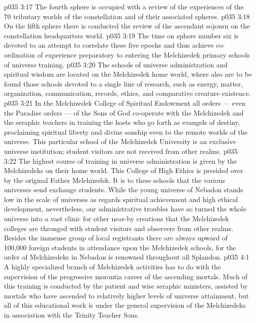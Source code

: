 \vs p035 3:17 \bibnobreakspace The fourth sphere is occupied with a review of the experiences of the 70 tributary worlds of the constellation and of their associated spheres.
\vs p035 3:18 \bibnobreakspace On the fifth sphere there is conducted the review of the ascendant sojourn on the constellation headquarters world.
\vs p035 3:19 \bibnobreakspace The time on sphere number six is devoted to an attempt to correlate these five epochs and thus achieve co\hyp{}ordination of experience preparatory to entering the Melchizedek primary schools of universe training.
\vs p035 3:20 \pc The schools of universe administration and spiritual wisdom are located on the Melchizedek home world, where also are to be found those schools devoted to a single line of research, such as energy, matter, organization, communication, records, ethics, and comparative creature existence.
\vs p035 3:21 In the Melchizedek College of Spiritual Endowment all orders --- even the Paradise orders --- of the Sons of God co\hyp{}operate with the Melchizedek and the seraphic teachers in training the hosts who go forth as evangels of destiny, proclaiming spiritual liberty and divine sonship even to the remote worlds of the universe. This particular school of the Melchizedek University is an exclusive universe institution; student visitors are not received from other realms.
\vs p035 3:22 The highest course of training in universe administration is given by the Melchizedeks on their home world. This College of High Ethics is presided over by the original Father Melchizedek. It is to these schools that the various universes send exchange students. While the young universe of Nebadon stands low in the scale of universes as regards spiritual achievement and high ethical development, nevertheless, our administrative troubles have so turned the whole universe into a vast clinic for other near\hyp{}by creations that the Melchizedek colleges are thronged with student visitors and observers from other realms. Besides the immense group of local registrants there are always upward of 100,000 foreign students in attendance upon the Melchizedek schools, for the order of Melchizedeks in Nebadon is renowned throughout all Splandon.
\vs p035 4:1 A highly specialized branch of Melchizedek activities has to do with the supervision of the progressive morontia career of the ascending mortals. Much of this training is conducted by the patient and wise seraphic ministers, assisted by mortals who have ascended to relatively higher levels of universe attainment, but all of this educational work is under the general supervision of the Melchizedeks in association with the Trinity Teacher Sons.
